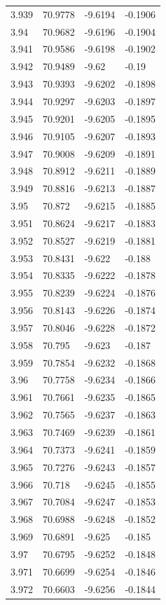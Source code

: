\begin{tabular}{llll}
3.939 & 70.9778 & -9.6194 & -0.1906 \\
3.94 & 70.9682 & -9.6196 & -0.1904 \\
3.941 & 70.9586 & -9.6198 & -0.1902 \\
3.942 & 70.9489 & -9.62 & -0.19 \\
3.943 & 70.9393 & -9.6202 & -0.1898 \\
3.944 & 70.9297 & -9.6203 & -0.1897 \\
3.945 & 70.9201 & -9.6205 & -0.1895 \\
3.946 & 70.9105 & -9.6207 & -0.1893 \\
3.947 & 70.9008 & -9.6209 & -0.1891 \\
3.948 & 70.8912 & -9.6211 & -0.1889 \\
3.949 & 70.8816 & -9.6213 & -0.1887 \\
3.95 & 70.872 & -9.6215 & -0.1885 \\
3.951 & 70.8624 & -9.6217 & -0.1883 \\
3.952 & 70.8527 & -9.6219 & -0.1881 \\
3.953 & 70.8431 & -9.622 & -0.188 \\
3.954 & 70.8335 & -9.6222 & -0.1878 \\
3.955 & 70.8239 & -9.6224 & -0.1876 \\
3.956 & 70.8143 & -9.6226 & -0.1874 \\
3.957 & 70.8046 & -9.6228 & -0.1872 \\
3.958 & 70.795 & -9.623 & -0.187 \\
3.959 & 70.7854 & -9.6232 & -0.1868 \\
3.96 & 70.7758 & -9.6234 & -0.1866 \\
3.961 & 70.7661 & -9.6235 & -0.1865 \\
3.962 & 70.7565 & -9.6237 & -0.1863 \\
3.963 & 70.7469 & -9.6239 & -0.1861 \\
3.964 & 70.7373 & -9.6241 & -0.1859 \\
3.965 & 70.7276 & -9.6243 & -0.1857 \\
3.966 & 70.718 & -9.6245 & -0.1855 \\
3.967 & 70.7084 & -9.6247 & -0.1853 \\
3.968 & 70.6988 & -9.6248 & -0.1852 \\
3.969 & 70.6891 & -9.625 & -0.185 \\
3.97 & 70.6795 & -9.6252 & -0.1848 \\
3.971 & 70.6699 & -9.6254 & -0.1846 \\
3.972 & 70.6603 & -9.6256 & -0.1844 \\

\end{tabular}
